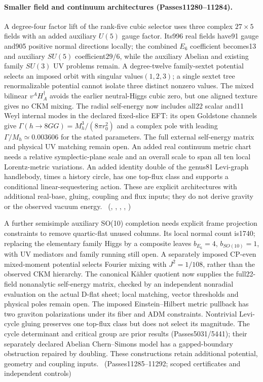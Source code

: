 \paragraph{Smaller field and continuum architectures (Passes11280--11284).}
A degree-four factor lift of the rank-five cubic selector uses three complex
$27\times5$ fields with an added auxiliary $U(5)$ gauge factor. Its996 real
fields have91 gauge and905 positive normal directions locally; the combined
$E_6$ coefficient becomes13 and auxiliary $SU(5)$ coefficient$29/6$, while
the auxiliary Abelian and existing family $SU(3)$ UV problems remain. A degree-twelve family-sextet
potential selects an imposed orbit with singular values$(1,2,3)$; a single
sextet tree renormalizable potential cannot isolate three distinct nonzero
values. The mixed bilinear $v^A H^\dagger_A$ avoids the earlier neutral-Higgs
cubic zero, but one aligned texture gives no CKM mixing.
The radial self-energy now includes all22 scalar and11 Weyl internal modes
in the declared fixed-slice EFT: its open Goldstone channels give
$\Gamma(h\to8GG)=M_h^3/(8\pi r_0^2)$ and a complex pole with leading
$\Gamma/M_h\simeq0.003606$ for the stated parameters. The full external
self-energy matrix and physical UV matching remain open.
An added real continuum metric chart needs a relative symplectic-plane scale
and an overall scale to span all ten local Lorentz-metric variations. An added
identity double of the genus81 Levi-graph handlebody, times a history circle,
has one top-flux class and supports a conditional linear-sequestering action.
These are explicit architectures with additional real-base, gluing, coupling
and flux inputs; they do not derive gravity or the observed vacuum energy.
\tierC\ (,
,
,
,
)

A further semisimple auxiliary SO(10) completion needs explicit frame
projection constraints to remove quartic-flat unused columns. Its local normal
count is1740; replacing the elementary family Higgs by a composite leaves
$b_{E_6}=4$, $b_{SO(10)}=1$, with UV mediators and family running still open.
A separately imposed CP-even mixed-moment potential selects Fourier mixing
with $J^2=1/108$, rather than the observed CKM hierarchy. The canonical
K\"ahler quotient now supplies the full22-field nonanalytic self-energy matrix,
checked by an independent nonradial evaluation on the actual D-flat sheet;
local matching, vector thresholds and physical poles remain open. The imposed
Einstein--Hilbert metric pullback has two graviton polarizations under its
fiber and ADM constraints. Nontrivial Levi-cycle gluing preserves one top-flux
class but does not select its magnitude. The cycle determinant and critical
group are prior results (Passes5031/5441); their separately declared Abelian
Chern--Simons model has a gapped-boundary obstruction repaired by doubling.
These constructions retain additional potential, geometry and coupling inputs.
\tierC\ (Passes11285--11292; scoped certificates and independent controls)

